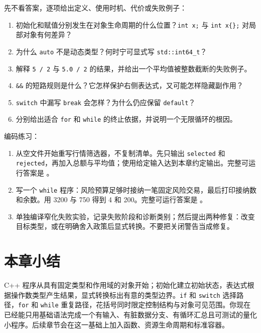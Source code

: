 先不看答案，逐项给出定义、使用时机、代价或失败例子：

\begin{enumerate}
  \item 初始化和赋值分别发生在对象生命周期的什么位置？\texttt{int x;} 与 \texttt{int x\{\};} 对局部对象有何差异？
  \item 为什么 \texttt{auto} 不是动态类型？何时宁可显式写 \texttt{std::int64\_t}？
  \item 解释 \texttt{5 / 2} 与 \texttt{5.0 / 2} 的结果，并给出一个平均值被整数截断的失败例子。
  \item \lstinline|&&| 的短路规则是什么？它怎样保护右侧表达式，又可能怎样隐藏副作用？
  \item \texttt{switch} 中漏写 \texttt{break} 会怎样？为什么仍应保留 \texttt{default}？
  \item 分别给出适合 \texttt{for} 和 \texttt{while} 的终止依据，并说明一个无限循环的根因。
\end{enumerate}

编码练习：

\begin{enumerate}
  \item 从空文件开始重写行情筛选器，不复制清单。先只输出 \texttt{selected} 和 \texttt{rejected}，再加入总额与平均值；使用给定输入达到本章约定输出。完整可运行答案是 。
  \item 写一个 \texttt{while} 程序：风险预算足够时接纳一笔固定风险交易，最后打印接纳数和余数。用 3200 与 750 得到 4 和 200。完整可运行答案是 。
  \item 单独编译窄化失败实验，记录失败阶段和诊断类别；然后提出两种修复：改变目标类型，或在明确舍入政策后显式转换。不要把关闭警告当成修复。
\end{enumerate}


\section{本章小结}

C++ 程序从具有固定类型和作用域的对象开始；初始化建立初始状态，表达式根据操作数类型产生结果，显式转换标出有意的类型边界。\texttt{if} 和 \texttt{switch} 选择路径，\texttt{for} 和 \texttt{while} 重复路径，花括号同时限定控制结构与对象可见范围。你现在已经能只用基础语法完成一个有输入、有脏数据分支、有循环汇总且可测试的量化小程序。后续章节会在这一基础上加入函数、资源生命周期和标准容器。
